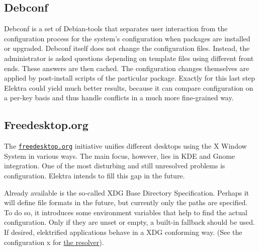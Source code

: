 \subsection*{Debconf}

Debconf is a set of Debian-\/tools that separates user interaction from the configuration process for the system's configuration when packages are installed or upgraded. Debconf itself does not change the configuration files. Instead, the administrator is asked questions depending on template files using different front ends. These answers are then cached. The configuration changes themselves are applied by post-\/install scripts of the particular package. Exactly for this last step Elektra could yield much better results, because it can compare configuration on a per-\/key basis and thus handle conflicts in a much more fine-\/grained way.

\subsection*{Freedesktop.\+org}

The \href{https://freedesktop.org}{\tt freedesktop.\+org} initiative unifies different desktops using the X Window System in various ways. The main focus, however, lies in K\+D\+E and Gnome integration. One of the most disturbing and still unresolved problems is configuration. Elektra intends to fill this gap in the future.

Already available is the so-\/called X\+D\+G Base Directory Specification. Perhaps it will define file formats in the future, but currently only the paths are specified. To do so, it introduces some environment variables that help to find the actual configuration. Only if they are unset or empty, a built-\/in fallback should be used. If desired, elektrified applications behave in a X\+D\+G conforming way. (See the configuration x for \hyperlink{md_src_plugins_resolver_README_src_plugins_resolver_README_md}{the resolver}). 